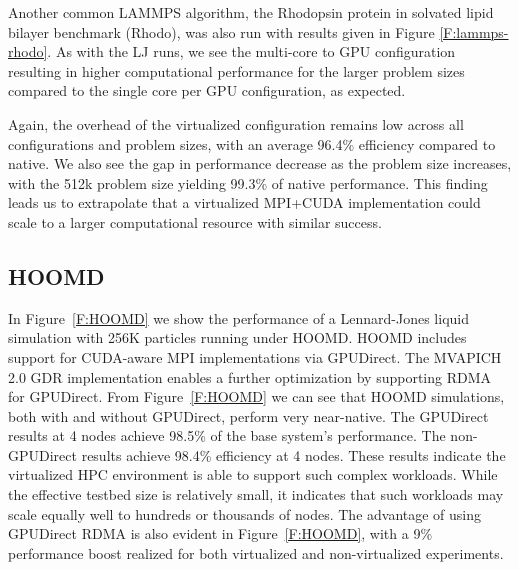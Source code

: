 \documentclass[10pt]{sigplanconf}
\begin{document}

Another common LAMMPS algorithm, the Rhodopsin protein in solvated lipid bilayer benchmark (Rhodo), was also run with results given in Figure \ref{F:lammps-rhodo}. As with the LJ runs, we see the multi-core to GPU configuration resulting in higher computational performance for the larger problem sizes compared to the single core per GPU configuration, as expected.  



Again, the overhead of the virtualized configuration remains low across all configurations and problem sizes, with an average 96.4\% efficiency compared to native. We also see the gap in performance decrease as the problem size increases, with the 512k problem size yielding 99.3\% of native performance.  This finding leads us to extrapolate that a virtualized MPI+CUDA implementation could scale to a larger computational resource with similar success. 


\subsection{HOOMD}






In Figure~\ref{F:HOOMD} we show the performance of a Lennard-Jones liquid
simulation with 256K particles running under HOOMD.  HOOMD includes support for
CUDA-aware MPI implementations via GPUDirect.  The MVAPICH 2.0 GDR
implementation enables a further optimization by supporting RDMA for GPUDirect.
From Figure~\ref{F:HOOMD} we can see that HOOMD simulations, both with and
without GPUDirect, perform very near-native.  The GPUDirect results at 4 nodes
achieve 98.5\% of the base system's performance.  The non-GPUDirect results
achieve 98.4\% efficiency at 4 nodes. These results indicate the virtualized HPC
environment is able to support such complex workloads. While the effective
testbed size is relatively small, it indicates that such workloads may scale
equally well to hundreds or thousands of nodes. The advantage of using GPUDirect
RDMA is also evident in Figure~\ref{F:HOOMD}, with a 9\% performance boost realized for both virtualized and non-virtualized experiments. 
\end{document}
